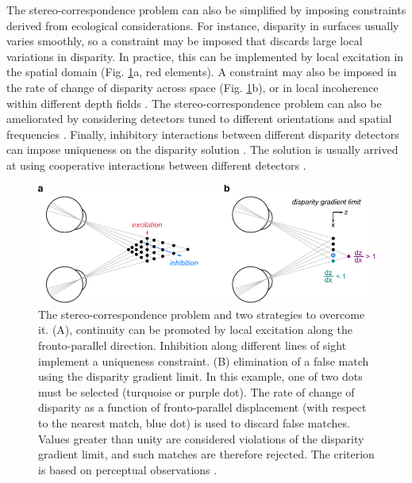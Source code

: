 The stereo-correspondence problem can also be simplified by imposing constraints derived from ecological considerations. For instance, disparity in surfaces usually varies smoothly, so a constraint may be imposed that discards large local variations in disparity. In practice, this can be implemented by local excitation in the spatial domain \cite{Sperling:1970ys,Nelson:1975oq,DEV1975511,Marr:1976dq} (Fig. \ref{fig:correspondence}a, red elements). A constraint may also be imposed in the rate of change of disparity across space \cite{Pollard01081985} (Fig. \ref{fig:correspondence}b), or in local incoherence within different depth fields \cite{Prazdny:1985vn}. The stereo-correspondence problem can also be ameliorated by considering detectors tuned to different orientations and spatial frequencies \cite{Marr:1979lh}. Finally, inhibitory interactions between different disparity detectors can impose uniqueness on the disparity solution \cite{Sperling:1970ys,Nelson:1975oq,DEV1975511,Marr:1976dq}. The solution is usually arrived at using cooperative interactions between different detectors \cite{Marr:1976dq,Marr:1979lh}.


\begin{figure}
  \centering
  \includegraphics[width=14cm, keepaspectratio]{corr-problem}
  \caption[The stereo-correspondence problem.]{The stereo-correspondence problem and two strategies to overcome it. (A), continuity can be promoted by local excitation along the fronto-parallel direction. Inhibition along different lines of sight implement a uniqueness constraint. (B) elimination of a false match using the disparity gradient limit. In this example, one of two dots must be selected (turquoise or purple dot). The rate of change of disparity as a function of fronto-parallel displacement (with respect to the nearest match, blue dot) is used to discard false matches. Values greater than unity are considered violations of the disparity gradient limit, and such matches are therefore rejected. The criterion is based on perceptual observations \cite{Burt:1980ys}.}
  \label{fig:correspondence}
\end{figure}

